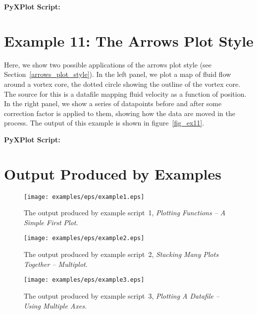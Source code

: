 \documentclass[a4paper,onecolumn,11pt]{book}
\begin{document}
\vspace{1cm}
\noindent \textbf{PyXPlot Script:}


\newpage
\section{Example 11: The Arrows Plot Style}
\label{ex11}

Here, we show two possible applications of the arrows plot style (see
Section~\ref{arrows_plot_style}). In the left panel, we plot a map of fluid flow around a vortex core, the
dotted circle showing the outline of the vortex core. The source for this is a
datafile mapping fluid velocity as a function of position. In the right panel,
we show a series of datapoints before and after some correction factor is
applied to them, showing how the data are moved in the process. The output of
this example is shown in figure~\ref{fig_ex11}.

\vspace{1cm}
\noindent \textbf{PyXPlot Script:}


\newpage
\section{Output Produced by Examples}
\label{gallery}

\begin{figure}[!h]
\centerline{\texttt{[image: examples/eps/example1.eps]}}
\caption{The output produced by example script~1, \textit{Plotting Functions -- A Simple First Plot}.}
\label{fig_ex1}
\end{figure}

\begin{figure}[!h]
\centerline{\texttt{[image: examples/eps/example2.eps]}}
\caption{The output produced by example script~2, \textit{Stacking Many Plots Together -- Multiplot}.}
\label{fig_ex2}
\end{figure}

\begin{figure}[!h]
\centerline{\texttt{[image: examples/eps/example3.eps]}}
\caption{The output produced by example script~3, \textit{Plotting A Datafile -- Using Multiple Axes}.}
\label{fig_ex3}
\end{figure}
\end{document}
